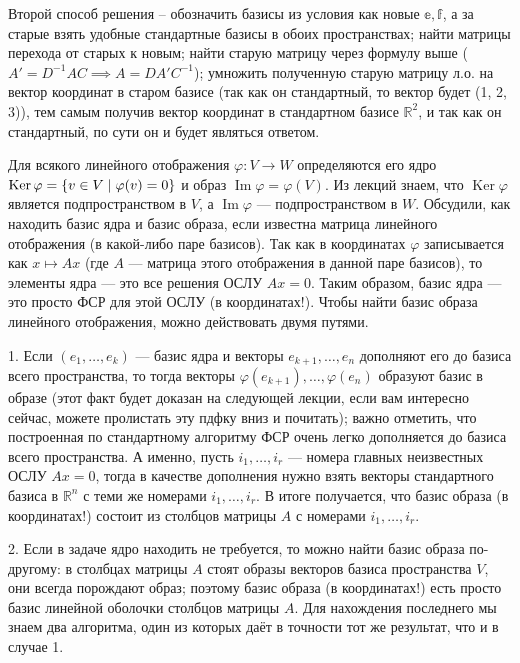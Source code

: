 \documentclass[10pt, a4paper]{extarticle}
\def \R{\mathbb{R}}
\newcommand{\Ker}{\mathop{\mathrm{Ker}}}
\renewcommand{\Im}{\mathop{\mathrm{Im}}}
\theoremstyle{definition}
\begin{document}
Второй способ решения -- обозначить базисы из условия как новые $\mathbb e, \mathbb f$, а за старые взять удобные стандартные базисы в обоих пространствах; 
найти матрицы перехода от старых к новым; найти старую матрицу через формулу выше ($A' = D^{-1}AC \implies A = DA'C^{-1}$); умножить полученную старую матрицу л.о. 
на вектор координат в старом базисе (так как он стандартный, то вектор будет (1, 2, 3)), тем самым получив вектор координат в стандартном базисе $\R^2$, 
и так как он стандартный, по сути он и будет являться ответом.

Для всякого линейного отображения $\varphi \colon V \to W$ определяются его ядро $\Ker \varphi = \lbrace v \in V \mid \varphi(v) =\nobreak 0 \rbrace$ и образ 
$\Im \varphi = \varphi(V)$. Из лекций знаем, что $\Ker \varphi$ является подпространством в $V$, а $\Im \varphi$ --- подпространством в $W$.
Обсудили, как находить базис ядра и базис образа, если известна матрица линейного отображения (в какой-либо паре базисов).
Так как в координатах $\varphi$ записывается как $x \mapsto Ax$ (где $A$ --- матрица этого отображения в данной паре базисов), то элементы ядра --- это все решения ОСЛУ $Ax = 0$.
Таким образом, базис ядра --- это просто ФСР для этой ОСЛУ (в координатах!).
Чтобы найти базис образа линейного отображения, можно действовать двумя путями.

1.
Если $(e_1,\dots,e_k)$ --- базис ядра и векторы $e_{k+1}, \dots, e_n$ дополняют его до базиса всего пространства, то тогда векторы $\varphi(e_{k+1}), \dots, \varphi(e_n)$ образуют базис в образе
(этот факт будет доказан на следующей лекции, если вам интересно сейчас, можете пролистать эту пдфку вниз и почитать); важно отметить, что построенная по стандартному алгоритму ФСР очень легко 
дополняется до базиса всего пространства. А именно, пусть $i_1,\dots, i_r$ --- номера главных неизвестных ОСЛУ $Ax=0$, тогда в качестве дополнения нужно взять векторы стандартного базиса в 
$\R^n$ с теми же номерами $i_1,\dots, i_r$. В итоге получается, что базис образа (в координатах!) состоит из столбцов матрицы $A$ с номерами $i_1,\dots, i_r$.

2.
Если в задаче ядро находить не требуется, то можно найти базис образа по-другому: в столбцах матрицы $A$ стоят образы векторов базиса пространства $V$, они всегда порождают образ; 
поэтому базис образа (в координатах!) есть просто базис линейной оболочки столбцов матрицы $A$.
Для нахождения последнего мы знаем два алгоритма, один из которых даёт в точности тот же результат, что и в случае 1.
\end{document}
